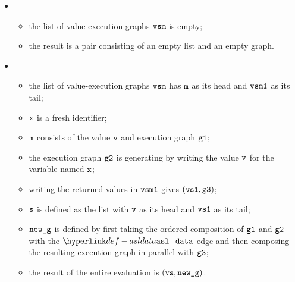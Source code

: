 \ProseParagraph
  \OneApplies
  \begin{itemize}
  \item {}
  \begin{itemize}
    \item the list of value-execution graphs $\texttt{vsm}$ is empty;
    \item the result is a pair consisting of an empty list and an empty graph.
  \end{itemize}

  \item {}
  \begin{itemize}
    \item the list of value-execution graphs $\texttt{vsm}$ has $\texttt{m}$ as its head and $\texttt{vsm1}$ as its tail;
    \item $\texttt{x}$ is a fresh identifier;
    \item $\texttt{m}$ consists of the value $\texttt{v}$ and execution graph $\texttt{g1}$;
    \item the execution graph $\texttt{g2}$ is generating by writing the value $\texttt{v}$ for the variable named $\texttt{x}$;
    \item writing the returned values in $\texttt{vsm1}$ gives $(\texttt{vs1}, \texttt{g3})$;
    \item $\texttt{s}$ is defined as the list with $\texttt{v}$ as its head and $\texttt{vs1}$ as its tail;
    \item $\texttt{new\_g}$ is defined by first taking the ordered composition of $\texttt{g1}$ and $\texttt{g2}$ with the $\asldata$ edge
    and then composing the resulting execution graph in parallel with $\texttt{g3}$;
    \item the result of the entire evaluation is $(\texttt{vs}, \texttt{new\_g})$.
  \end{itemize}
\end{itemize}

%

\FormallyParagraph

